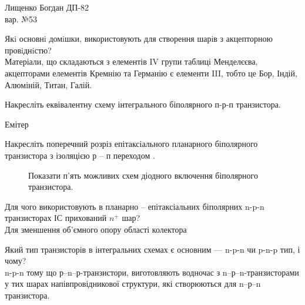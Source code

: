 \documentclass[a4paper,14pt]{extreport}
\begin{document}
\begin{center}
Лищенко Богдан ДП-82 \\
вар. №53
\end{center}



      \begin{enumerate}
\item Якi основнi домiшки, використовують для створення шарiв з акцепторною провiднiстю?\\

Матеріали, що складаються з елементів IV групи таблиці Менделєєва, акцепторами елементів Кремнію та Германію є елементи III, тобто це Бор, Індій, Алюміній, Титан, Галій.\\

\item Накресліть еквівалентну схему інтегрального біполярного п-р-п транзистора.

\begin{figure}[h]
\end{figure}
\item Емітер\\

\item Накресліть поперечний розріз епітаксіального планарного біполярного транзистора з ізоляцією р – п переходом .\par
\begin{figure}[h!]
\end{figure}
\newpage
\begin{figure}[h!]
\item  Показати п’ять можливих схем діодного включення біполярного транзистора.\par
{}
\end{figure}

\item Для чого використовують в планарно – епітаксіальних біполярних n-p-n транзисторах ІС прихований $n^+$ шар?\\

Для зменшення об'ємного опору області колектора\\


\item  Який тип транзисторів в інтегральних схемах є основним — n-p-n чи p-n-p тип, і чому?\\

n-p-n тому що р–n–р-транзистори, виготовляють водночас з n–р–n-транзисторами у тих шарах напівпровідникової структури, які створюються для n–р–n транзистора.\\



\end{enumerate}
\end{document}
